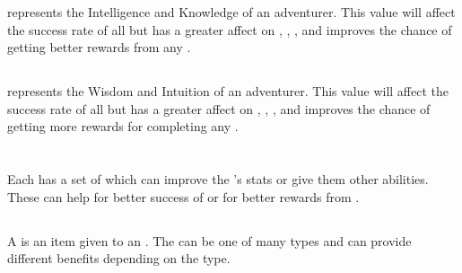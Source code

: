  represents the Intelligence and Knowledge of an adventurer. This value will affect the success rate of all  but has a greater affect on , , , and improves the chance of getting better rewards from any .

\subsection{}

 represents the Wisdom and Intuition of an adventurer. This value will affect the success rate of all  but has a greater affect on , , , and improves the chance of getting more rewards for completing any .




\section{}

Each  has a set of  which can improve the 's stats or give them other abilities. These  can help for better success of  or for better rewards from .

\subsection{}

A  is an item given to an . The  can be one of many types and can provide different benefits depending on the type.

\subsection{}

\subsection{}

\subsection{}
